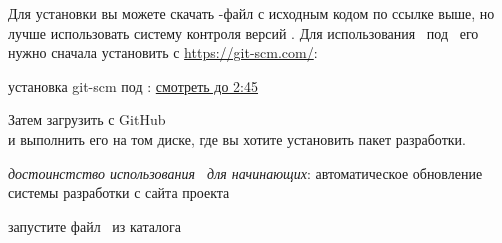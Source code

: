 
\clearpage
Для установки вы можете скачать -файл с исходным кодом по ссылке выше,
но лучше использовать систему контроля версий \git.
Для использования \git\ под \win\ его нужно сначала установить с \url{https://git-scm.com/}:

\bigskip
установка git-scm под \win: \href{https://www.youtube.com/watch?v=qt-QDN3MyeM}{смотреть до 2:45}

\bigskip\noindent
Затем загрузить с GitHub \href{https://github.com/ponyatov/cansat_samara/raw/master/install.bat}{}\\
и выполнить его на том диске, где вы хотите установить пакет разработки.

\bigskip
\noindent
\emph{достоинстство использования \git\ для начинающих}: автоматическое обновление
системы разработки с сайта проекта

\bigskip
запустите файл \ из каталога 
